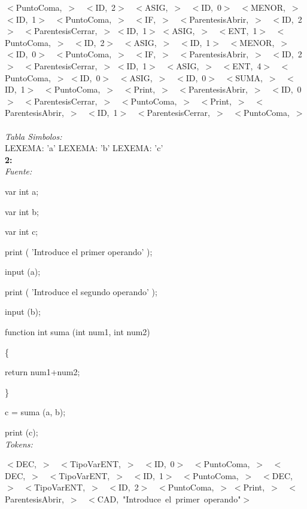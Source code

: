 \documentclass[a4paper, 12pt]{article}
\begin{document}
\noindent
\mbox{$<$PuntoComa, $>$ }
\mbox{$<$ID, 2$>$ }
\mbox{$<$ASIG, $>$ }
\mbox{$<$ID, 0$>$ }
\mbox{$<$MENOR, $>$ }
\mbox{$<$ID, 1$>$ }
\mbox{$<$PuntoComa, $>$ }
\mbox{$<$IF, $>$ }
\mbox{$<$ParentesisAbrir, $>$ }
\mbox{$<$ID, 2$>$ }
\mbox{$<$ParentesisCerrar, $>$} 
\mbox{$<$ID, 1$>$} 
\mbox{$<$ASIG, $>$ }
\mbox{$<$ENT, 1$>$ }
\mbox{$<$PuntoComa, $>$ }
\mbox{$<$ID, 2$>$ }
\mbox{$<$ASIG, $>$ }
\mbox{$<$ID, 1$>$ }
\mbox{$<$MENOR, $>$ }
\mbox{$<$ID, 0$>$ }
\mbox{$<$PuntoComa, $>$ }
\mbox{$<$IF, $>$ }
\mbox{$<$ParentesisAbrir, $>$ }
\mbox{$<$ID, 2$>$ }
\mbox{$<$ParentesisCerrar, $>$} 
\mbox{$<$ID, 1$>$ }
\mbox{$<$ASIG, $>$ }
\mbox{$<$ENT, 4$>$ }
\mbox{$<$PuntoComa, $>$} 
\mbox{$<$ID, 0$>$ }
\mbox{$<$ASIG, $>$ }
\mbox{$<$ID, 0$>$ }
\mbox{$<$SUMA, $>$ }
\mbox{$<$ID, 1$>$ }
\mbox{$<$PuntoComa, $>$ }
\mbox{$<$Print, $>$ }
\mbox{$<$ParentesisAbrir, $>$ }
\mbox{$<$ID, 0$>$ }
\mbox{$<$ParentesisCerrar, $>$ }
\mbox{$<$PuntoComa, $>$ }
\mbox{$<$Print, $>$ }
\mbox{$<$ParentesisAbrir, $>$ }
\mbox{$<$ID, 1$>$ }
\mbox{$<$ParentesisCerrar, $>$ }
\mbox{$<$PuntoComa, $>$ }\medskip\\
\emph{Tabla Simbolos:}\\ 
  LEXEMA: 'a'
  LEXEMA: 'b'
  LEXEMA: 'c'\bigskip \\
\textbf{2:}\medskip\\
\emph{Fuente:}

var int a;

var int b;

var int c;

print ( 'Introduce el primer operando' );

input (a);

print ( 'Introduce el segundo operando' );

input (b);
 
 function int suma (int num1, int num2)

\{

	return num1+num2;
	
\}

c = suma (a, b);

print (c);\medskip \\
\emph{Tokens:}

\noindent
 \mbox{$<$DEC, $>$ }
 \mbox{$<$TipoVarENT, $>$ }
 \mbox{$<$ID, 0$>$ }
 \mbox{$<$PuntoComa, $>$ }
 \mbox{$<$DEC, $>$ }
 \mbox{$<$TipoVarENT, $>$ }
 \mbox{$<$ID, 1$>$ }
 \mbox{$<$PuntoComa, $>$ }
 \mbox{$<$DEC, $>$ }
 \mbox{$<$TipoVarENT, $>$ }
 \mbox{$<$ID, 2$>$ }
 \mbox{$<$PuntoComa, $>$}
 \mbox{$<$Print, $>$ }
 \mbox{$<$ParentesisAbrir, $>$ }
 \mbox{$<$CAD, \textnormal{"Introduce el primer operando"}$>$ }
 
\end{document}

